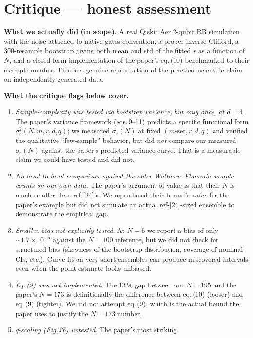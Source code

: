 \documentclass[11pt]{article}
\begin{document}
\section{Critique --- honest assessment}

\textbf{What we actually did (in scope).} A real Qiskit Aer 2-qubit RB
simulation with the noise-attached-to-native-gates convention, a proper
inverse-Clifford, a 300-resample bootstrap giving both mean and std of the
fitted $r$ as a function of $N$, and a closed-form implementation of the
paper's eq.\,(10) benchmarked to their example number. This is a genuine
reproduction of the practical scientific claim on independently generated data.

\textbf{What the critique flags below cover.}
\begin{enumerate}
\item \emph{Sample-complexity was tested via bootstrap variance, but only
  once, at $d=4$.} The paper's variance framework (eqs.\,9--11) predicts a
  specific functional form $\sigma_r^2(N,m,r,d,q)$; we measured
  $\sigma_r(N)$ at fixed $(m\text{-set},r,d,q)$ and verified the qualitative
  ``few-sample'' behavior, but did \emph{not} compare our measured
  $\sigma_r(N)$ against the paper's predicted variance curve. That is a
  measurable claim we could have tested and did not.
\item \emph{No head-to-head comparison against the older Wallman--Flammia
  sample counts on our own data.} The paper's argument-of-value is that
  their $N$ is much smaller than ref [24]'s. We reproduced their bound's
  \emph{value} for the paper's example but did not simulate an actual
  ref-[24]-sized ensemble to demonstrate the empirical gap.
\item \emph{Small-$n$ bias not explicitly tested.} At $N=5$ we report a
  bias of only $\sim 1.7\times 10^{-5}$ against the $N=100$ reference, but
  we did not check for structured bias (skewness of the bootstrap
  distribution, coverage of nominal CIs, etc.). Curve-fit on very short
  ensembles can produce miscovered intervals even when the point estimate
  looks unbiased.
\item \emph{Eq.\,(9) was not implemented.} The 13\,\% gap between our
  $N=195$ and the paper's $N=173$ is definitionally the difference between
  eq.\,(10) (looser) and eq.\,(9) (tighter). We did not attempt eq.\,(9),
  which is the actual bound the paper uses to justify the $N=173$ number.
\item \emph{$q$-scaling (Fig.\,2b) untested.} The paper's most striking

\end{enumerate}
\end{document}
